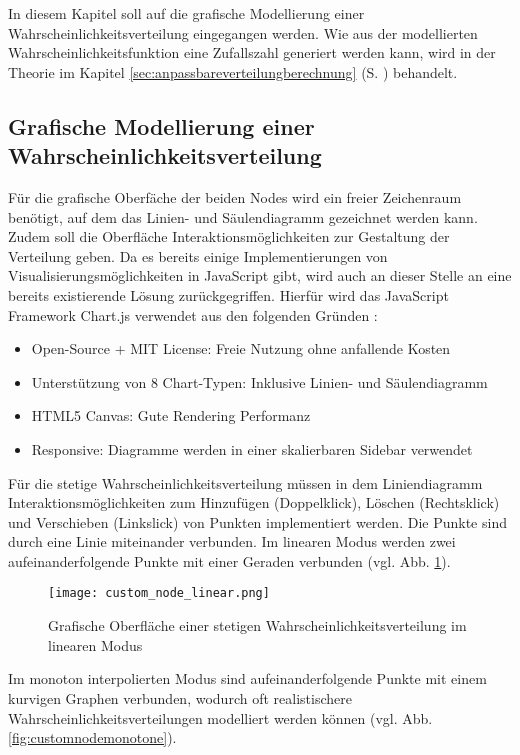 In diesem Kapitel soll auf die grafische Modellierung einer Wahrscheinlichkeitsverteilung eingegangen werden. Wie aus der modellierten Wahrscheinlichkeitsfunktion eine Zufallszahl generiert werden kann, wird in der Theorie im Kapitel \ref{sec:anpassbareverteilungberechnung} (S. \pageref{sec:anpassbareverteilungberechnung}) behandelt.

\subsection{Grafische Modellierung einer Wahrscheinlichkeitsverteilung}

Für die grafische Oberfäche der beiden Nodes wird ein freier Zeichenraum benötigt, auf dem das Linien- und Säulendiagramm gezeichnet werden kann. Zudem soll die Oberfläche Interaktionsmöglichkeiten zur Gestaltung der Verteilung geben. Da es bereits einige Implementierungen von Visualisierungsmöglichkeiten in JavaScript gibt, wird auch an dieser Stelle an eine bereits existierende Lösung zurückgegriffen. Hierfür wird das JavaScript Framework Chart.js verwendet aus den folgenden Gründen \cite{chartjs}:
\begin{itemize}
    \item Open-Source + MIT License: Freie Nutzung ohne anfallende Kosten
    \item Unterstützung von 8 Chart-Typen: Inklusive Linien- und Säulendiagramm
    \item HTML5 Canvas: Gute Rendering Performanz
    \item Responsive: Diagramme werden in einer skalierbaren Sidebar verwendet
\end{itemize}

Für die stetige Wahrscheinlichkeitsverteilung müssen in dem Liniendiagramm Interaktionsmöglichkeiten zum Hinzufügen (Doppelklick), Löschen (Rechtsklick) und Verschieben (Linkslick) von Punkten implementiert werden. Die Punkte sind durch eine Linie miteinander verbunden. Im linearen Modus werden zwei aufeinanderfolgende Punkte mit einer Geraden verbunden (vgl. Abb. \ref{fig:customnodelinear}).

\begin{figure}[H]
    \centering
    \texttt{[image: custom\_node\_linear.png]}
    \caption{Grafische Oberfläche einer stetigen Wahrscheinlichkeitsverteilung im linearen Modus}\label{fig:customnodelinear}
\end{figure}

Im monoton interpolierten Modus sind aufeinanderfolgende Punkte mit einem kurvigen Graphen verbunden, wodurch oft realistischere Wahrscheinlichkeitsverteilungen modelliert werden können (vgl. Abb. \ref{fig:customnodemonotone}).

